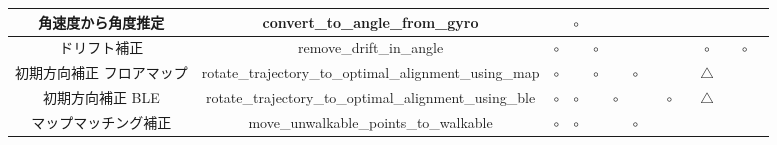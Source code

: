 \begin{table}[ht]
{\begin{tabular}{|c|c|c|c|c|c|c|c|c|c|c|c|c|c|}
			角速度から角度推定     & convert\_to\_angle\_from\_gyro                         &                              & \multicolumn{1}{c|}{$\circ$} &                              &                              &                              &                                                                                                               &                              &                              &                                  &    &                              &    \\ \hline
			ドリフト補正        & remove\_drift\_in\_angle                               & \multicolumn{1}{c|}{$\circ$} &                              & \multicolumn{1}{c|}{$\circ$} &                              &                              &                                                                                                               &                              &                              & \multicolumn{1}{c|}{$\circ$}     &    & \multicolumn{1}{c|}{$\circ$} &    \\ \hline
			初期方向補正 フロアマップ & rotate\_trajectory\_to\_optimal\_alignment\_using\_map & \multicolumn{1}{c|}{$\circ$} &                              & \multicolumn{1}{c|}{$\circ$} &                              & \multicolumn{1}{c|}{$\circ$} &                                                                                                               &                              &                              & \multicolumn{1}{c|}{$\triangle$} &    &                              &    \\ \hline
			初期方向補正 BLE    & rotate\_trajectory\_to\_optimal\_alignment\_using\_ble & \multicolumn{1}{c|}{$\circ$} & \multicolumn{1}{c|}{$\circ$} &                              & \multicolumn{1}{c|}{$\circ$} &                              &                                                                                                               & \multicolumn{1}{c|}{$\circ$} &                              & \multicolumn{1}{c|}{$\triangle$} &    &                              &    \\ \hline
			マップマッチング補正    & move\_unwalkable\_points\_to\_walkable                 & \multicolumn{1}{c|}{$\circ$} & \multicolumn{1}{c|}{$\circ$} &                              &                              & \multicolumn{1}{c|}{$\circ$} &                                                                                                               &                              &                              &                                  &    &                              &    \\ \hline

\end{tabular}}
\end{table}
